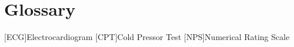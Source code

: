 \chapter{Glossary}

\footnotesize
\SingleSpacing

\begin{multicols}{2}
\begin{acronym}[AAAAAA]

	[ECG]{Electrocardiogram}
	[CPT]{Cold Pressor Test}
	[NPS]{Numerical Rating Scale}

\end{acronym}
\end{multicols}

